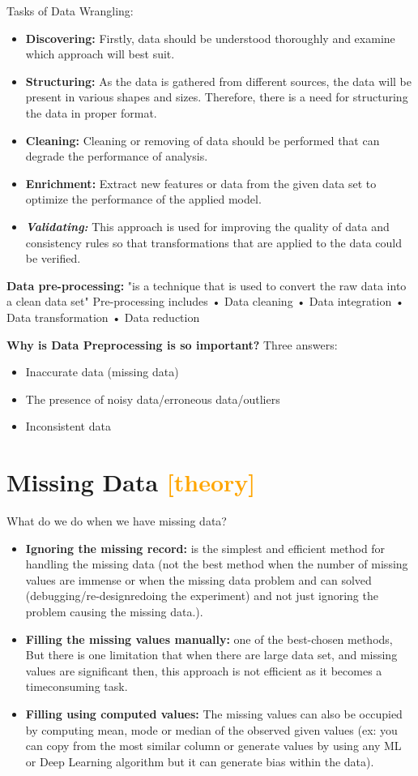 \noindent Tasks of Data Wrangling:
\begin{itemize}
    \item \textbf{Discovering:} Firstly, data should be understood thoroughly and examine which approach will best suit. 
    \item \textbf{Structuring:} As the data is gathered from different sources, the data will be present in various shapes and sizes. Therefore, there is a need for structuring the data in proper format.
    \item \textbf{Cleaning:} Cleaning or removing of data should be performed that can degrade the performance of analysis.
    \item \textbf{Enrichment:} Extract new features or data from the given data set to optimize the performance of the applied model.
    \item \textbf{\textit{Validating:}} This approach is used for improving the quality of data and consistency rules so that transformations that are applied to the data could be verified.
\end{itemize}

\noindent \textbf{Data pre-processing:} "is a technique that is used to convert the raw data into a clean data set"
\noindent Pre-processing includes • Data cleaning • Data integration • Data transformation • Data reduction

\noindent \textbf{Why is Data Preprocessing is so important?}
\noindent Three answers:
\begin{itemize}
    \item Inaccurate data (missing data) 
    \item The presence of noisy data/erroneous data/outliers
    \item Inconsistent data 
\end{itemize}

\section{Missing Data \textcolor{orange}{[theory]}}
\noindent What do we do when we have missing data? 
\begin{itemize}
    \item \textbf{Ignoring the missing record:} is the simplest and efficient method for handling the missing data (not the best method when the number of missing values are immense or  when the missing data problem and can solved (debugging/re-designredoing the experiment) and not just ignoring the problem causing the missing data.). 
    \item \textbf{Filling the missing values manually:} one of the best-chosen methods, But there is one limitation that when there are large data set, and missing values are significant then, this approach is not efficient as it becomes a timeconsuming task.
    \item \textbf{Filling using computed values:} The missing values can also be occupied by computing mean, mode or median of the observed given values (ex: you can copy from the most similar column or generate values by using any ML or Deep Learning algorithm but  it can generate bias within the data). 
\end{itemize}

